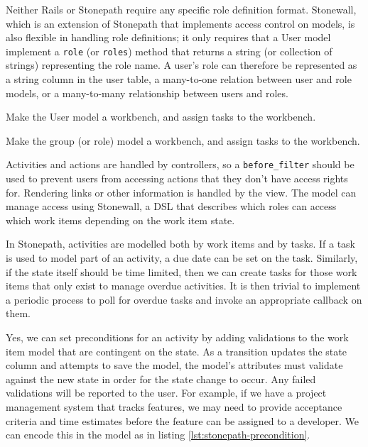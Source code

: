 
Neither Rails or Stonepath require any specific role definition format. Stonewall, which is an extension of Stonepath that implements access control on models, is also flexible in handling role definitions; it only requires that a User model implement a \verb!role! (or \verb!roles!) method that returns a string (or collection of strings) representing the role name. A user’s role can therefore be represented as a string column in the user table, a many-to-one relation between user and role models, or a many-to-many relationship between users and roles.


Make the User model a workbench, and assign tasks to the workbench.


Make the group (or role) model a workbench, and assign tasks to the workbench.


Activities and actions are handled by controllers, so a \verb!before_filter! should be used to prevent users from accessing actions that they don’t have access rights for. Rendering links or other information is handled by the view. The model can manage access using Stonewall, a DSL that describes which roles can access which work items depending on the work item state.


In Stonepath, activities are modelled both by work items and by tasks. If a task is used to model part of an activity, a due date can be set on the task. Similarly, if the state itself should be time limited, then we can create tasks for those work items that only exist to manage overdue activities. It is then trivial to implement a periodic process to poll for overdue tasks and invoke an appropriate callback on them.


Yes, we can set preconditions for an activity by adding validations to the work item model that are contingent on the state. As a transition updates the state column and attempts to save the model, the model’s attributes must validate against the new state in order for the state change to occur. Any failed validations will be reported to the user. For example, if we have a project management system that tracks features, we may need to provide acceptance criteria and time estimates before the feature can be assigned to a developer.
We can encode this in the model as in listing \ref{lst:stonepath-precondition}.

